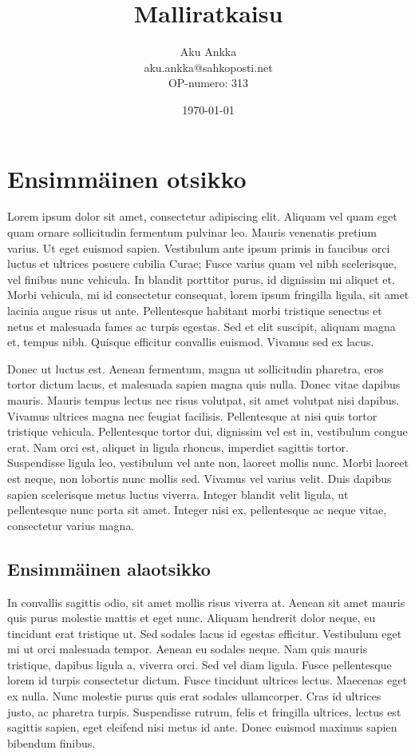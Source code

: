 \documentclass[12pt,a4paper,titlepage]{article}
\author{Aku Ankka \\ aku.ankka@sahkoposti.net \\ OP-numero: 313}
\title{Malliratkaisu}
\date{\today}
\begin{document}
\maketitle

\tableofcontents
\newpage


\section{Ensimmäinen otsikko}
Lorem ipsum dolor sit amet, consectetur adipiscing elit. Aliquam vel quam eget quam ornare sollicitudin fermentum pulvinar leo. Mauris venenatis pretium varius. Ut eget euismod sapien. Vestibulum ante ipsum primis in faucibus orci luctus et ultrices posuere cubilia Curae; Fusce varius quam vel nibh scelerisque, vel finibus nunc vehicula. In blandit porttitor purus, id dignissim mi aliquet et. Morbi vehicula, mi id consectetur consequat, lorem ipsum fringilla ligula, sit amet lacinia augue risus ut ante. Pellentesque habitant morbi tristique senectus et netus et malesuada fames ac turpis egestas. Sed et elit suscipit, aliquam magna et, tempus nibh. Quisque efficitur convallis euismod. Vivamus sed ex lacus.

Donec ut luctus est. Aenean fermentum, magna ut sollicitudin pharetra, eros tortor dictum lacus, et malesuada sapien magna quis nulla. Donec vitae dapibus mauris. Mauris tempus lectus nec risus volutpat, sit amet volutpat nisi dapibus. Vivamus ultrices magna nec feugiat facilisis. Pellentesque at nisi quis tortor tristique vehicula. Pellentesque tortor dui, dignissim vel est in, vestibulum congue erat. Nam orci est, aliquet in ligula rhoncus, imperdiet sagittis tortor. Suspendisse ligula leo, vestibulum vel ante non, laoreet mollis nunc. Morbi laoreet est neque, non lobortis nunc mollis sed. Vivamus vel varius velit. Duis dapibus sapien scelerisque metus luctus viverra. Integer blandit velit ligula, ut pellentesque nunc porta sit amet. Integer nisi ex, pellentesque ac neque vitae, consectetur varius magna.

\subsection{Ensimmäinen alaotsikko}
In convallis sagittis odio, sit amet mollis risus viverra at. Aenean sit amet mauris quis purus molestie mattis et eget nunc. Aliquam hendrerit dolor neque, eu tincidunt erat tristique ut. Sed sodales lacus id egestas efficitur. Vestibulum eget mi ut orci malesuada tempor. Aenean eu sodales neque. Nam quis mauris tristique, dapibus ligula a, viverra orci. Sed vel diam ligula. Fusce pellentesque lorem id turpis consectetur dictum. Fusce tincidunt ultrices lectus. Maecenas eget ex nulla. Nunc molestie purus quis erat sodales ullamcorper. Cras id ultrices justo, ac pharetra turpis. Suspendisse rutrum, felis et fringilla ultrices, lectus est sagittis sapien, eget eleifend nisi metus id ante. Donec euismod maximus sapien bibendum finibus.
\end{document}
